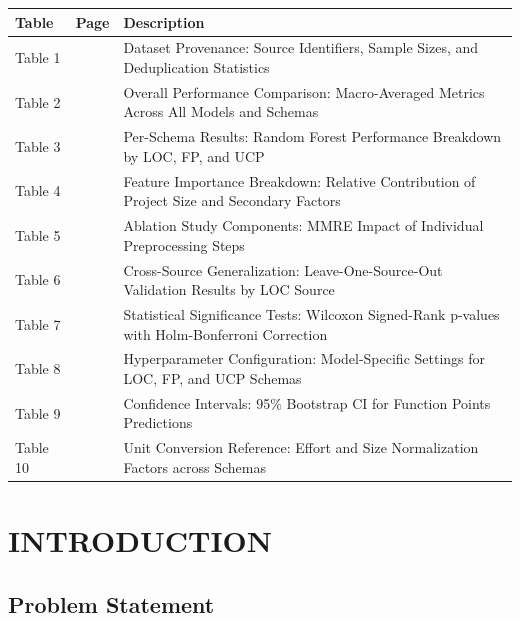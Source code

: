 \documentclass[11pt,a4paper]{article}
\begin{document}
\noindent
\begin{tabular}{|p{}|p{}|p{}|}
\hline
\textbf{\Large Table} & \textbf{\Large Page} & \textbf{\Large Description} \\
\hline
Table 1 & \pageref{tab:dataset-manifest} & Dataset Provenance: Source Identifiers, Sample Sizes, and Deduplication Statistics \\
\hline
Table 2 & \pageref{tab:overall-results} & Overall Performance Comparison: Macro-Averaged Metrics Across All Models and Schemas \\
\hline
Table 3 & \pageref{tab:per-schema} & Per-Schema Results: Random Forest Performance Breakdown by LOC, FP, and UCP \\
\hline
Table 4 & \pageref{tab:feature-importance} & Feature Importance Breakdown: Relative Contribution of Project Size and Secondary Factors \\
\hline
Table 5 & \pageref{tab:ablation} & Ablation Study Components: MMRE Impact of Individual Preprocessing Steps \\
\hline
Table 6 & \pageref{tab:loso} & Cross-Source Generalization: Leave-One-Source-Out Validation Results by LOC Source \\
\hline
Table 7 & \pageref{tab:stat-tests} & Statistical Significance Tests: Wilcoxon Signed-Rank p-values with Holm-Bonferroni Correction \\
\hline
Table 8 & \pageref{tab:hyperparams} & Hyperparameter Configuration: Model-Specific Settings for LOC, FP, and UCP Schemas \\
\hline
Table 9 & \pageref{tab:bootstrap-ci} & Confidence Intervals: 95\% Bootstrap CI for Function Points Predictions \\
\hline
Table 10 & \pageref{tab:unit-conversion} & Unit Conversion Reference: Effort and Size Normalization Factors across Schemas \\
\hline
\end{tabular}

\vspace{0.3cm}

\newpage

\section{INTRODUCTION}

\subsection{Problem Statement}
\end{document}
